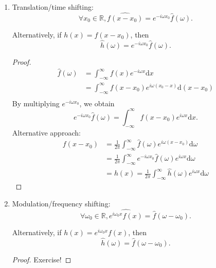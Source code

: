 \documentclass[12pt]{report}
\theoremstyle{definition}
\begin{document}
\begin{enumerate}[label = (\roman*)]
    \item Translation/time shifting:
        \[
            \forall x_0\in\mathbb{R}, \widehat{f(x-x_0)} = e^{-i\omega x_0}\hat{f}(\omega).
        \]

        Alternatively, if $h(x) = f(x-x_0)$, then\[
            \hat{h}(\omega) = e^{-i\omega x_0}\hat{f}(\omega).
        \]
        \begin{proof}
            \begin{align*}
                \hat{f}(\omega)
                & = \int_{-\infty}^{\infty} f(x)e^{-i\omega x}\mathrm{d}x \\
                & = \int_{-\infty}^{\infty} f(x-x_0)e^{i\omega(x_0-x)}\mathrm{d}(x-x_0) \\
            \end{align*} 
            By multiplying $e^{-i\omega x_0}$, we obtain\[
                e^{-i\omega x_0}\hat{f}(\omega) = \int_{-\infty}^{\infty} f(x-x_0)e^{i\omega x}\mathrm{d}x.
            \]Alternative approach:
            \begin{align*}
                f(x-x_0)
                & = \frac{1}{2\pi}\int_{-\infty}^{\infty} \hat{f}(\omega)e^{i\omega (x-x_0)}\mathrm{d}\omega \\
                & = \frac{1}{2\pi}\int_{-\infty}^{\infty} e^{-i\omega x_0}\hat{f}(\omega)e^{i\omega x}\mathrm{d}\omega \\
                & = h(x) = \frac{1}{2\pi}\int_{-\infty}^{\infty} \hat{h}(\omega)e^{i\omega x}\mathrm{d}\omega
            \end{align*} 
        \end{proof} 

    \item Modulation/frequency shifting:
        \[
            \forall \omega_0\in\mathbb{R}, \widehat{e^{i\omega_0x}f(x)} = \hat{f}(\omega - \omega_0).
        \]

        Alternatively, if $h(x) = e^{i\omega_0x}f(x)$, then\[
            \hat{h}(\omega) = \hat{f}(\omega - \omega_0).
        \]

        \begin{proof}
            Exercise!
        \end{proof} 


\end{enumerate}
\end{document}
